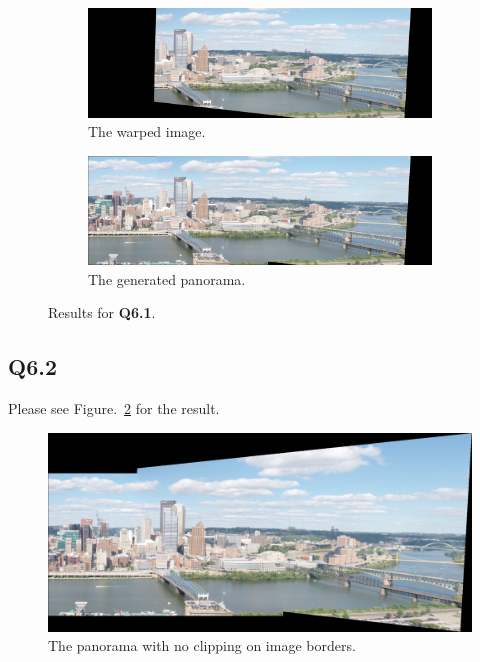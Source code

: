 \documentclass[11pt]{article}
\begin{document}
\begin{figure}[h!]
    \begin{subfigure}{\textwidth}
      \centering
      \includegraphics[width=.8\linewidth]{../results/q6_1_warp.jpg}
      \caption{The warped image. }
    \end{subfigure}
    \begin{subfigure}{\textwidth}
      \centering
      \includegraphics[width=.8\linewidth]{../results/q6_1_pan.jpg}
      \caption{The generated panorama. }
    \end{subfigure}
    \caption{Results for \textbf{Q6.1}. }
    \label{fig:q6.1}
\end{figure}

\newpage

\subsection*{Q6.2}

Please see Figure.~\ref{fig:q6.2} for the result.

\begin{figure}[h!]
    \centering
    \includegraphics[width=.8\linewidth]{../results/q6_2_pan.jpg}
    \caption{The panorama with no clipping on image borders. }
    \label{fig:q6.2}
\end{figure}
\end{document}
